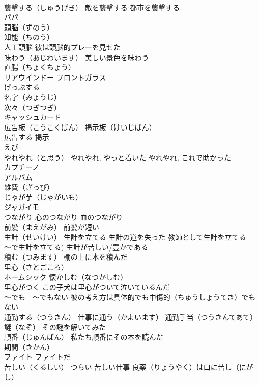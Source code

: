 \documentclass[8pt]{extreport}
\begin{document}
\begin{CJK}{UTF8}{min}
\\	襲撃する（しゅうげき） 敵を襲撃する 都市を襲撃する
\\	パパ
\\	頭脳（ずのう）
\\	知能（ちのう）
\\	人工頭脳 彼は頭脳的プレーを見せた
\\	味わう（あじわいます） 美しい景色を味わう
\\	直腸（ちょくちょう）
\\	リアウインドー フロントガラス
\\	げっぷする
\\	名字（みょうじ）
\\	次々（つぎつぎ）
\\	キャッシュカード
\\	広告板（こうこくばん） 掲示板（けいじばん）
\\	広告する 掲示
\\	えび
\\	やれやれ（と思う） やれやれ, やっと着いた やれやれ, これで助かった
\\	カプチーノ
\\	アルバム
\\	雑費（ざっぴ）
\\	じゃが芋（じゃがいも） 
\\	ジャガイモ
\\	つながり 心のつながり 血のつながり
\\	前髪（まえがみ） 前髪が短い
\\	生計（せいけい） 生計を立てる 生計の道を失った 教師として生計を立てる 
\\	～で生計を立てる) 生計が苦しい/豊かである
\\	積む（つみます） 棚の上に本を積んだ
\\	里心（さとごころ）
\\	ホームシック 懐かしむ（なつかしむ）
\\	里心がつく この子犬は里心がついて泣いているんだ
\\	～でも　～でもない 彼の考え方は具体的でも中傷的（ちゅうしょうてき）でもない
\\	通勤する（つうきん） 仕事に通う（かよいます） 通勤手当（つうきんてあて）
\\	謎（なぞ） その謎を解いてみた
\\	順番（じゅんばん） 私たち順番にその本を読んだ
\\	期間（きかん）
\\	ファイト ファイトだ
\\	苦しい（くるしい） つらい 苦しい仕事 良薬（りょうやく）は口に苦し（にがし）

\end{CJK}
\end{document}
